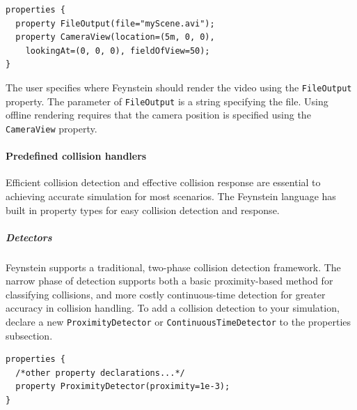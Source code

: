 \begin{verbatim}
properties {
  property FileOutput(file="myScene.avi");
  property CameraView(location=(5m, 0, 0), 
    lookingAt=(0, 0, 0), fieldOfView=50);
}
\end{verbatim}

The user specifies where Feynstein should render the video using
the \texttt{FileOutput} property. The parameter of \texttt{File\-Output} is a
string specifying the file. Using offline rendering requires that the
camera position is specified using the \texttt{CameraView} property.

\paragraph{Predefined collision handlers}
Efficient collision detection and effective collision response are
essential to achieving accurate simulation for most scenarios. The
Feynstein language has built in property types for easy collision
detection and response.

\subparagraph{Detectors}

Feynstein supports a traditional, two-phase collision detection
framework. The narrow phase of detection supports both a basic proximity-based
method for classifying collisions, and more costly continuous-time detection for greater accuracy in
collision handling. To add a collision detection to your simulation, declare a
new \texttt{ProximityDetector} or \texttt{ContinuousTimeDetector} to the properties subsection. 

\begin{verbatim}                                                                                                                                             
properties {                                                                                                                                                 
  /*other property declarations...*/                                                                                                                         
  property ProximityDetector(proximity=1e-3);                                                                                                                
}                                                                                                                                                            
\end{verbatim}

